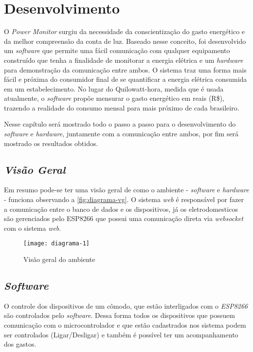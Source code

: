 \chapter[Desenvolvimento]{Desenvolvimento}
\label{ch:desenvolvimento}
O \textit{Power Monitor} surgiu da necessidade da conscientização do gasto energético e da melhor compreensão da conta de luz. Baseado nesse conceito,
foi desenvolvido um \textit{software} que permite uma fácil comunicação com qualquer equipamento construído que tenha a finalidade de monitorar a energia elétrica e um \textit{hardware} para demonstração
da comunicação entre ambos. O sistema traz uma forma mais fácil e próxima do consumidor final de se quantificar a energia elétrica consumida em um estabelecimento. No lugar do Quilowatt-hora, medida que é usada atualmente,
o \textit{software} propõe mensurar o gasto energético em reais (R\$), trazendo a realidade do consumo mensal para mais próximo de cada brasileiro.

Nesse capítulo será mostrado todo o passo a passo para o desenvolvimento do \textit{software} e \textit{hardware}, juntamente com a comunicação 
entre ambos, por fim será mostrado os resultados obtidos. 


\section[\textit{Visão Geral}]{\textit{Visão Geral}}\label{visal-geral}

Em resumo pode-se ter uma visão geral de como o ambiente - \textit{software} e \textit{hardware} - funciona observando a \autoref{fig:diagrama-vg}.
O sistema \textit{web} é responsável por fazer a comunicação entre o banco de dados e os dispositivos, já os eletrodomesticos são gerenciados
pelo ESP8266 que possui uma comunicação direta via \textit{websocket} com o sistema \textit{web}.

\begin{figure}[h!]
	\texttt{[image: diagrama-1]}
	\centering
	\caption[Visão geral do ambiente]{Visão geral do ambiente}
	\label{fig:diagrama-vg}
\end{figure}
\FloatBarrier

\section[\textit{Software}]{\textit{Software}}\label{soft-sec}
O controle dos dispositivos de um cômodo, que estão interligados com o \textit{ESP8266} são controlados pelo \textit{software}. Dessa forma
todos os dispositivos que possuem comunicação com o microcontrolador e que estão cadastrados nos sistema podem ser controlados (Ligar/Desligar) e também
é possível ter um acompanhamento dos gastos.

